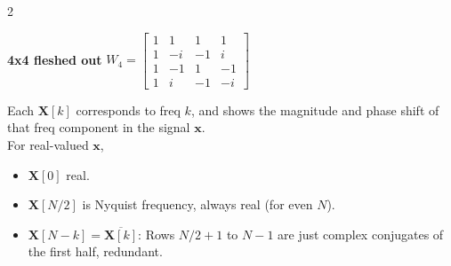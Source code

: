 \documentclass[10pt]{article}
\begin{document}
\begin{multicols*}{2}
\vspace{0.5em}
\noindent
{}

\textbf{4x4 fleshed out} $W_4 = \begin{bmatrix}
        1 & 1 & 1 & 1 \\
        1 & -i & -1 & i \\
        1 & -1 & 1 & -1 \\
        1 & i & -1 & -i
        \end{bmatrix}$
        

Each $\mathbf{X}[k]$ corresponds to freq $k$, and shows the magnitude and phase shift of that freq component in the signal $\mathbf{x}$.\\
For real-valued $\mathbf{x}$,
\begin{itemize}
    \item $\mathbf{X}[0]$ real.
    \item $\mathbf{X}[N/2]$ is Nyquist frequency, always real (for even $N$).
    \item $\mathbf{X}[N-k] = \overline{\mathbf{X}[k]}$: Rows $N/2 + 1$ to $N-1$ are just complex conjugates of the first half, redundant.
\end{itemize}


\end{multicols*}
\end{document}
